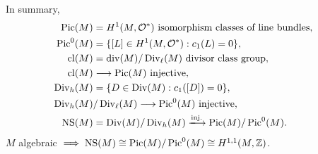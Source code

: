 \documentclass[12pt]{article}
\begin{document}
In summary,
\begin{align*}
  \op{Pic}(M)&=H^1(M,\mathcal{O}^*)\text{ isomorphism classes of line bundles}, \\
  \op{Pic}^0(M)&=\{[L]\in H^1(M,\mathcal{O}^*):c_1(L)=0\}, \\
  \op{cl}(M)&=\op{div}(M)/\op{Div}_\ell(M)\text{ divisor class group}, \\
  \op{cl}(M)&\lrr \op{Pic}(M)\text{ injective}, \\
  \op{Div}_h(M)&=\{D\in \op{Div}(M):c_1([D])=0\}, \\
  \op{Div}_h(M)&/\op{Div}_\ell(M)\lrr \op{Pic}^0(M)\text{ injective}, \\
  \op{NS}(M)&=\op{Div}(M)/\op{Div}_h(M)\xrr{\text{inj.}}
  \op{Pic}(M)/\op{Pic}^0(M)
.\end{align*}
\(M\) algebraic \(\implies\operatorname{NS}(M)\cong\operatorname{Pic}(M)/\operatorname{Pic}^0(M)\cong
H^{1,1}(M,\mathbb{Z})\).
\end{document}
